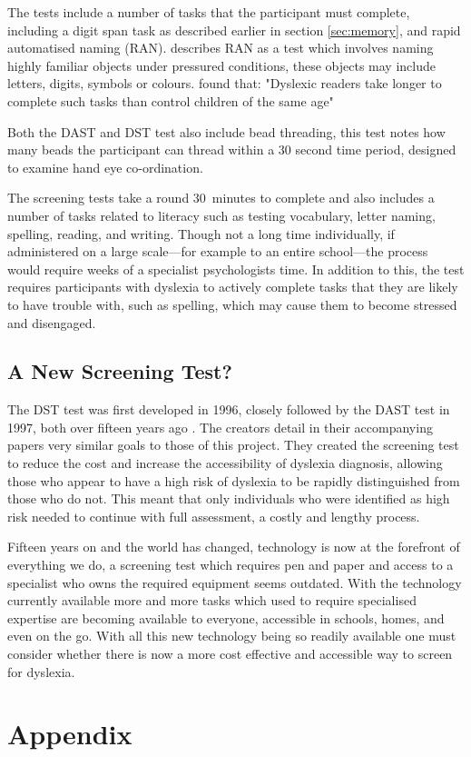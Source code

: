 \documentclass[journal]{IEEEtran}
\begin{document}
The tests include a number of tasks that the participant must complete, including a digit span task as described earlier in section \ref{sec:memory}, and rapid automatised naming (RAN).
\cite{snowling} describes RAN as a test which involves naming highly familiar objects 
under pressured conditions, these objects may include letters, digits, symbols or colours. \cite{snowling} found that:
 "Dyslexic readers take longer to complete such tasks than control children of the same age"
 
Both the DAST and DST test also include bead threading, this test notes how many beads the participant can thread within a 30 second time period, designed to examine hand eye co-ordination\cite{motorskills}.

The screening tests take a round 30~minutes to complete and also includes a number of tasks related to literacy such as testing vocabulary, letter naming, spelling, reading, and writing\cite{screeningTests}. Though not a long time individually, if administered on a large scale---for example to an entire school---the process would require weeks of a specialist psychologists time. In addition to this, the test requires participants with dyslexia to actively complete tasks that they are likely to have trouble with, such as spelling, which may cause them to become stressed and disengaged. 

\subsection{A New Screening Test?}
The DST test was first developed in 1996, closely followed by the DAST test in 1997, both over fifteen years ago \cite{dastTest, dstTest}. The creators detail in their accompanying papers very similar goals to those of this project. They created the screening test to reduce the cost and increase the accessibility of dyslexia diagnosis, allowing those who appear to have a high risk of dyslexia to be rapidly distinguished from those who do not. This meant that only individuals who were identified as high risk needed to continue with full assessment, a costly and lengthy process.

Fifteen years on and the world has changed, technology is now at the forefront of everything we do, a screening test which requires pen and paper and access to a specialist who owns the required equipment seems outdated. 
With the technology currently available more and more tasks which used to require specialised expertise are becoming available to everyone, accessible in schools, homes, and even on the go. With all this new technology being so readily available one must consider whether there is now a more cost effective and accessible way to screen for dyslexia.



\section{Appendix}
\end{document}
